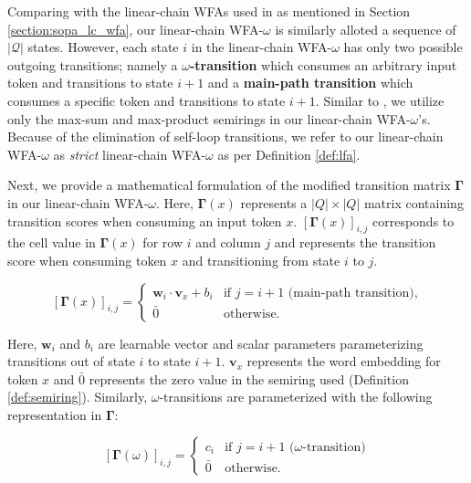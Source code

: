 Comparing with the linear-chain WFAs used in \citet{schwartz2018sopa} as
mentioned in Section \ref{section:sopa_lc_wfa}, our linear-chain WFA-$\omega$ is
similarly alloted a sequence of $|\mathcal{Q}|$ states. However, each state $i$
in the linear-chain WFA-$\omega$ has only two possible outgoing transitions;
namely a \textbf{$\omega$-transition} which consumes an arbitrary input token
and transitions to state $i+1$ and a \textbf{main-path transition} which
consumes a specific token and transitions to state $i+1$. Similar to
\citet{schwartz2018sopa}, we utilize only the max-sum and max-product semirings
in our linear-chain WFA-$\omega$'s. Because of the elimination of self-loop
transitions, we refer to our linear-chain WFA-$\omega$ as \textit{strict}
linear-chain WFA-$\omega$ as per Definition \ref{def:lfa}. 

Next, we provide a mathematical formulation of the modified transition matrix
$\bm{\Gamma}$ in our linear-chain WFA-$\omega$. Here, $\bm{\Gamma}(x)$ represents a
$|Q|\times|Q|$ matrix containing transition scores when consuming an input token
$x$. $[\bm{\Gamma}(x)]_{i,j}$ corresponds to the cell value in $\bm{\Gamma}(x)$ for row
$i$ and column $j$ and represents the transition score when consuming token $x$
and transitioning from state $i$ to $j$.

\begin{equation}
  \label{eq:spp_transition_matrix_main}
  [\bm{\Gamma}(x)]_{i,j} =
  \begin{cases}
    \bm{w}_i \cdot \bm{v}_x + b_i  & \text{if } j = i + 1 \text{ (main-path transition),} \\
    \bar{0} & \text{otherwise.}
  \end{cases}
\end{equation}

Here, $\bm{w}_i$ and $b_i$ are learnable vector and scalar parameters
parameterizing transitions out of state $i$ to state $i+1$. $\bm{v}_x$
represents the word embedding for token $x$ and $\bar{0}$ represents the zero
value in the semiring used (Definition \ref{def:semiring}). Similarly,
$\omega$-transitions are parameterized with the following representation in
$\bm{\Gamma}$:

\begin{equation}
  \label{eq:spp_transition_matrix_omega}
  [\bm{\Gamma}(\omega)]_{i,j} =
  \begin{cases}
    c_i  & \text{if } j = i + 1 \text{ ($\omega$-transition)} \\
    \bar{0} & \text{otherwise.}
  \end{cases}
\end{equation}

